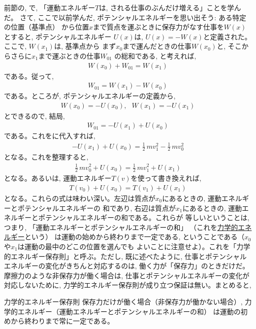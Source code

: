 前節の, で, 
「運動エネルギー$T$は, される仕事のぶんだけ増える」ことを学んだ。
さて, ここで以前学んだ, ポテンシャルエネルギーを思い出そう: ある特定の位置（基準点）
から位置$x$まで質点を運ぶときに保存力がなす仕事を$W(x)$とすると, ポテンシャルエネルギー
$U(x)$は, $U(x)=-W(x)$と定義された。ここで, $W(x_1)$は, 基準点から
まず$x_0$まで運んだときの仕事$W(x_0)$と, そこからさらに$x_1$まで運ぶときの仕事$W_{01}$
の総和である, と考えれば, 
\begin{eqnarray} 
W(x_0)+W_{01}=W(x_1)
\end{eqnarray} 
である。従って, 
\begin{eqnarray} 
W_{01}=W(x_1)-W(x_0)
\end{eqnarray} 
である。ところが, ポテンシャルエネルギーの定義から, 
\begin{eqnarray} 
W(x_0)=-U(x_0),\,\,\,\, W(x_1)=-U(x_1)
\end{eqnarray} 
とできるので, 結局, 
\begin{eqnarray} 
W_{01}=-U(x_1)+U(x_0)\label{eq:W01U1U0}
\end{eqnarray} 
である。これをに代入すれば, 
\begin{eqnarray} 
-U(x_1)+U(x_0)=\frac{1}{2}\,mv_1^2-\frac{1}{2}\,mv_0^2
\end{eqnarray} 
となる。これを整理すると, 
\begin{eqnarray} 
\frac{1}{2}\,mv_0^2+U(x_0)=\frac{1}{2}\,mv_1^2+U(x_1)\label{eq:DEcons}
\end{eqnarray} 
となる。あるいは, 運動エネルギー$T(v)$を使って書き換えれば, 
\begin{eqnarray} 
T(v_0)+U(x_0)=T(v_1)+U(x_1)\label{eq:DEcons2}
\end{eqnarray} 
となる。これらの式は味わい深い。左辺は質点が$x_0$にあるときの, 運動エネルギーとポテンシャルエネルギーの
和であり, 右辺は質点が$x_1$にあるときの, 運動エネルギーとポテンシャルエネルギーの和である。これらが
等しいということは, つまり, 「運動エネルギーとポテンシャルエネルギーの和」
（これを\underline{力学的エネルギー}という）
は運動の始めから終わりまで一定である, ということである（$x_0$や$x_1$は運動の最中のどこの位置を選んでも
よいことに注意せよ）。これを「力学的エネルギー保存則」と呼ぶ。ただし, 既に述べたように, 
仕事とポテンシャルエネルギーの変化がきちんと対応するのは, 働く力が「保存力」のときだけだ。
摩擦力のような非保存力が働く場合は, 仕事とポテンシャルエネルギーの変化が対応しないために, 
力学的エネルギー保存則が成り立つ保証は無い。まとめると, 
\begin{itembox}{力学的エネルギー保存則}
保存力だけが働く場合（非保存力が働かない場合）, 
力学的エネルギー（運動エネルギーとポテンシャルエネルギーの和）
は運動の初めから終わりまで常に一定である。
\end{itembox}

